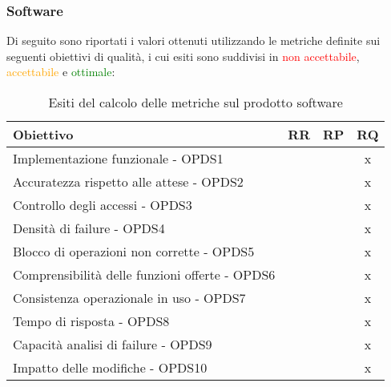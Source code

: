 \documentclass[PdQ.tex]{subfiles}
\begin{document}
	\subsubsection{Software}
	Di seguito sono riportati i valori ottenuti utilizzando le metriche definite sui seguenti obiettivi di qualità, i cui esiti sono suddivisi in \textcolor{red}{non accettabile}, \textcolor{orange}{accettabile} e \textcolor{green}{ottimale}:
	\begin{table}[h]
				\centering
				\begin{tabular}{l c c c}
					\hline
					\rule[-0.3cm]{0cm}{0.8cm}
					\textbf{Obiettivo} & \textbf{RR} & \textbf{RP} & \textbf{RQ}\\
					\hline
					\rule[0cm]{0cm}{0.4cm}
					Implementazione funzionale - OPDS1 & & & x \\
					\rule[0cm]{0cm}{0.4cm}
					Accuratezza rispetto alle attese - OPDS2 & & & x \\
					\rule[0cm]{0cm}{0.4cm}
					Controllo degli accessi - OPDS3 & & & x \\
					\rule[0cm]{0cm}{0.4cm}
					Densità di failure - OPDS4 & & & x \\
					\rule[0cm]{0cm}{0.4cm}
					Blocco di operazioni non corrette - OPDS5 & & & x \\
					\rule[0cm]{0cm}{0.4cm}
					Comprensibilità delle funzioni offerte - OPDS6 & & & x \\
					\rule[0cm]{0cm}{0.4cm}
					Consistenza operazionale in uso - OPDS7 & & & x \\
					\rule[0cm]{0cm}{0.4cm}
					Tempo di risposta - OPDS8 & & & x \\
					\rule[0cm]{0cm}{0.4cm}
					Capacità analisi di failure - OPDS9 & & & x \\
					\rule[0cm]{0cm}{0.4cm}
					Impatto delle modifiche - OPDS10 & & & x \\
					\hline
				\end{tabular}
				\caption{Esiti del calcolo delle metriche sul prodotto software}
			\end{table}
\end{document}
